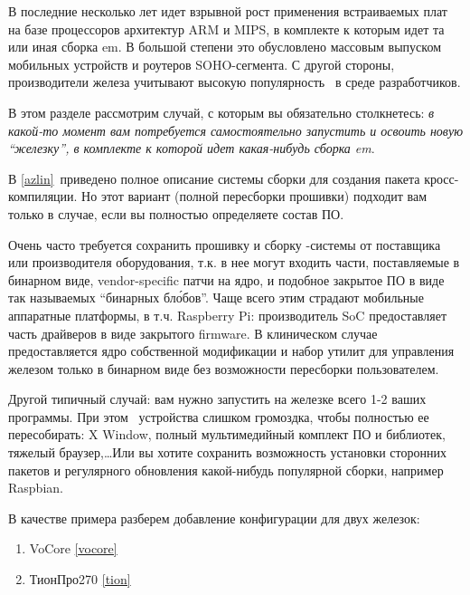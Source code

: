\secdown

В последние несколько лет идет взрывной рост применения встраиваемых плат на
базе процессоров архитектур ARM и MIPS, в комплекте к которым идет та или иная
сборка em\linux. В большой степени это обусловлено массовым выпуском мобильных
устройств и роутеров SOHO-сегмента. С другой стороны, производители железа
учитывают высокую популярность \linux\ в среде разработчиков.

В этом разделе рассмотрим случай, с которым вы обязательно столкнетесь: \emph{в
какой-то момент вам потребуется самостоятельно запустить и освоить новую
``железку'', в комплекте к которой идет какая-нибудь сборка em\linux}.

В \ref{azlin}\ приведено полное описание системы сборки для создания пакета
кросс-компиляции. Но этот вариант (полной пересборки прошивки) подходит вам
только в случае, если вы полностью определяете состав ПО.

Очень часто требуется сохранить прошивку и сборку \linux-системы от поставщика
или производителя оборудования, т.к. в нее могут входить части, поставляемые в
бинарном виде, vendor-specific патчи на ядро, и подобное закрытое ПО в виде так
называемых ``бинарных бл\'{о}бов''. Чаще всего этим страдают мобильные
аппаратные платформы, в т.ч. Raspberry Pi: производитель
SoC предоставляет часть драйверов в виде закрытого
firmware. В клиническом случае предоставляется ядро собственной модификации и
набор утилит для управления железом только в бинарном виде без возможности
пересборки пользователем.

Другой типичный случай: вам нужно запустить на железке всего 1-2 ваших
программы. При этом  \linux\
устройства слишком громоздка, чтобы полностью ее пересобирать: X Window, полный
мультимедийный комплект ПО и библиотек, тяжелый браузер,\ldots Или вы хотите
сохранить возможность установки сторонних пакетов и регулярного обновления
какой-нибудь популярной сборки, например Raspbian.

\bigskip

В качестве примера разберем добавление конфигурации для двух железок:

\begin{enumerate}
  \item VoCore \ref{vocore}
  \item ТионПро270 \ref{tion}
\end{enumerate}

\secup
